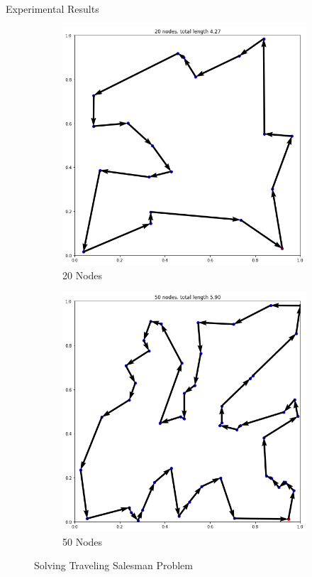 \documentclass[9pt]{beamer}
\begin{document}
\begin{frame}{Experimental Results}
\begin{figure}[H]
\captionsetup[subfigure]{justification=centering}
     \centering
    \begin{subfigure}{0.48\linewidth}
         \centering
         \includegraphics[width=0.9\linewidth]{images/learned_20.png}
         \caption{20 Nodes}
        \label{fig:bandit}
     \end{subfigure}
      \begin{subfigure}{0.48\linewidth}
         \centering
         \includegraphics[width=0.9\linewidth]{images/learned_50.png}
         \caption{50 Nodes}
     \end{subfigure}
     \caption{Solving Traveling Salesman Problem}
\end{figure}    
\end{frame}
\end{document}

